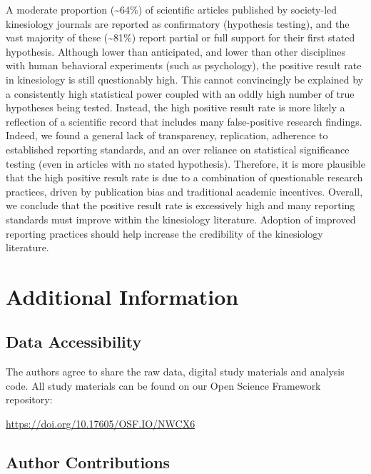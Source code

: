 \documentclass[]{cik}%
\begin{document}
A moderate proportion (\textasciitilde64\%) of scientific articles
published by society-led kinesiology journals are reported as
confirmatory (hypothesis testing), and the vast majority of these
(\textasciitilde81\%) report partial or full support for their first
stated hypothesis. Although lower than anticipated, and lower than other
disciplines with human behavioral experiments (such as psychology), the
positive result rate in kinesiology is still questionably high. This
cannot convincingly be explained by a consistently high statistical
power coupled with an oddly high number of true hypotheses being tested.
Instead, the high positive result rate is more likely a reflection of a
scientific record that includes many false-positive research findings.
Indeed, we found a general lack of transparency, replication, adherence
to established reporting standards, and an over reliance on statistical
significance testing (even in articles with no stated hypothesis).
Therefore, it is more plausible that the high positive result rate is
due to a combination of questionable research practices, driven by
publication bias and traditional academic incentives. Overall, we
conclude that the positive result rate is excessively high and many
reporting standards must improve within the kinesiology literature.
Adoption of improved reporting practices should help increase the
credibility of the kinesiology literature.

\newpage

\hypertarget{additional-information}{%
\section{Additional Information}\label{additional-information}}

\hypertarget{data}{%
\subsection{Data Accessibility}\label{data}}

The authors agree to share the raw data, digital study materials and
analysis code. All study materials can be found on our Open Science
Framework repository:

\url{https://doi.org/10.17605/OSF.IO/NWCX6}

\hypertarget{author-contributions}{%
\subsection{Author Contributions}\label{author-contributions}}
\end{document}
